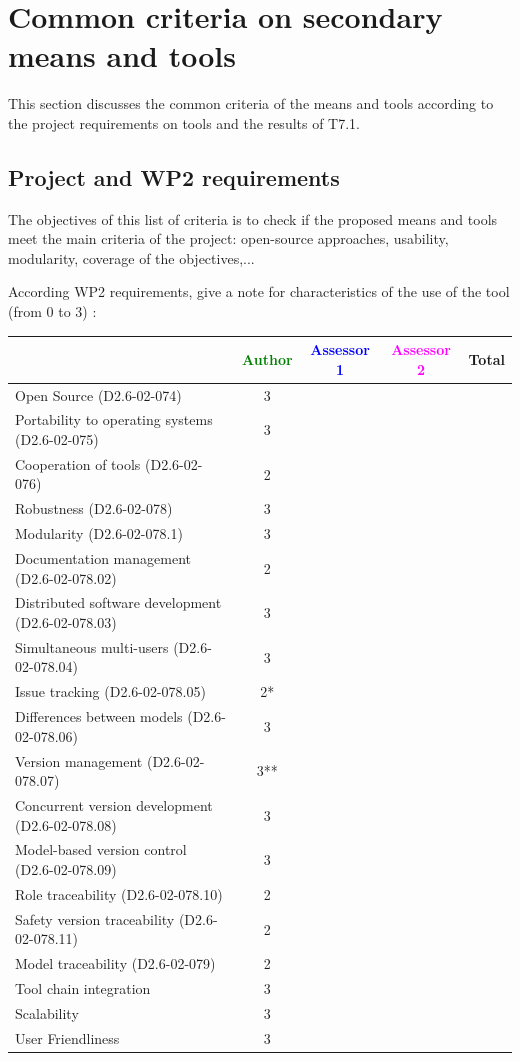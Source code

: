 \section{Common criteria on secondary means and tools}
\label{common}
This section discusses the common criteria of the means and tools according to the project requirements on tools and the results of T7.1.

\subsection{Project and WP2 requirements}

The objectives of this list of criteria is to check if the proposed means and tools meet the main criteria of the project: open-source approaches, usability, modularity, coverage of the objectives,...

According WP2 requirements, give a note for characteristics of the use of the tool (from 0 to 3) :

\begin{tabular}{|l | c | c | c | c|}
\hline
& \textcolor{green}{Author} & \textcolor{blue}{Assessor 1} & \textcolor{magenta}{Assessor 2} & Total \\
\hline 
Open Source (D2.6-02-074) &3 & & &  \\
\hline 
Portability to operating systems (D2.6-02-075) &3 & & &  \\
\hline
Cooperation of tools (D2.6-02-076) &2 & & &  \\
\hline
Robustness (D2.6-02-078) &3 & & & \\
\hline
Modularity (D2.6-02-078.1) &3 & & & \\
\hline
Documentation management (D2.6-02-078.02) &2 & & & \\
\hline
Distributed software development (D2.6-02-078.03)  &3 & & & \\
\hline
Simultaneous multi-users (D2.6-02-078.04)   &3 & & & \\
\hline
Issue tracking (D2.6-02-078.05) &2* & & & \\
\hline
Differences between models (D2.6-02-078.06) &3 & & & \\
\hline
Version management (D2.6-02-078.07) &3** & & & \\
\hline
Concurrent version development (D2.6-02-078.08) &3 & & & \\
\hline
Model-based version control (D2.6-02-078.09) &3 & & & \\
\hline
Role traceability (D2.6-02-078.10) &2 & & & \\
\hline
Safety version traceability (D2.6-02-078.11) &2 & & & \\
\hline
Model traceability (D2.6-02-079) &2 & & & \\
\hline
Tool chain integration &3 & & & \\
\hline
Scalability &3 & & & \\
\hline
User Friendliness &3 & & & \\
\hline
\end{tabular}

